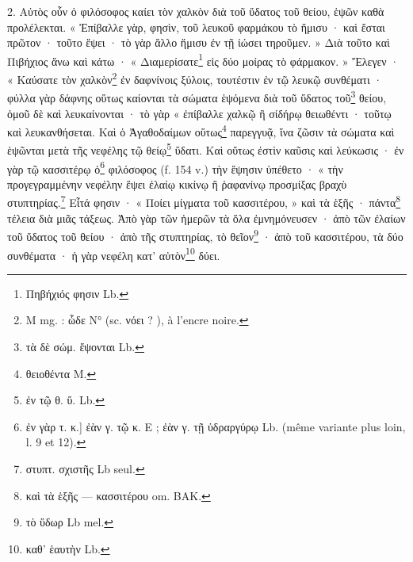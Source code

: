 \documentclass[landscape, a4paper, 11pt, oneside, polutonikogreek, french]{article}
\begin{document}
2. Αὐτὸς οὖν ὁ φιλόσοφος καίει τὸν χαλκὸν διὰ τοῦ ὕδατος τοῦ θείου, ἑψῶν καθὰ προλέλεκται. « Ἐπίβαλλε γὰρ, φησὶν, τοῦ λευκοῦ φαρμάκου τὸ ἥμισυ · καὶ ἔσται πρῶτον · τοῦτο ἕψει · τὸ γὰρ ἄλλο ἥμισυ ἐν τῇ ἰώσει τηροῦμεν. » Διὰ τοῦτο καὶ Πιβήχιος ἄνω καὶ κάτω · « Διαμερίσατε\footnote{Πηβήχιός φησιν Lb.} εἰς δύο μοίρας τὸ φάρμακον. » Ἔλεγεν · « Καύσατε τὸν χαλκὸν\footnote{M mg. : ὧδε N° (sc. νόει ? ), à l'encre noire.} ἐν δαφνίνοις ξύλοις, τουτέστιν ἐν τῷ λευκῷ συνθέματι · φύλλα γὰρ δάφνης οὕτως καίονται τὰ σώματα ἑψόμενα διὰ τοῦ ὕδατος τοῦ\footnote{τὰ δὲ σώμ. ἕψονται Lb.} θείου, ὀμοῦ δὲ καὶ λευκαίνονται · τὸ γὰρ « ἐπίβαλλε χαλκῷ ἢ σίδήρῳ θειωθέντι · τοῦτῳ καὶ λευκανθήσεται. Καὶ ὁ Ἀγαθοδαίμων οὕτως\footnote{θειοθέντα M.} παρεγγυᾷ, ἵνα ζῶσιν τὰ σώματα καὶ ἑψῶνται μετὰ τῆς νεφέλης τῷ θείῳ\footnote{ἐν τῷ θ. ὕ. Lb.} ὕδατι. Καὶ οὕτως ἐστὶν καῦσις καὶ λεύκωσις · ἐν γὰρ τῷ κασσιτέρῳ ὁ\footnote{ἐν γὰρ τ. κ.] ἐὰν γ. τῷ κ. E ; ἐὰν γ. τῇ ὑδραργύρῳ Lb. (même variante plus loin, l. 9 et 12).} φιλόσοφος (f. 154 v.) τὴν ἕψησιν ὑπέθετο · « τὴν προγεγραμμένην νεφέλην ἕψει ἐλαίῳ κικίνῳ ἢ ῥαφανίνῳ προσμίξας βραχὺ στυπτηρίας.\footnote{στυπτ. σχιστῆς Lb seul.} Εἶτά φησιν · « Ποίει μίγματα τοῦ κασσιτέρου, » καὶ τὰ ἑξῆς · πάντα\footnote{καὶ τὰ ἑξῆς --- κασσιτέρου om. BAK.} τέλεια διὰ μιᾶς τάξεως. Ἀπὸ γὰρ τῶν ἡμερῶν τὰ ὅλα ἐμνημόνευσεν · ἀπὸ τῶν ἐλαίων τοῦ ὕδατος τοῦ θείου · ἀπὸ τῆς στυπτηρίας, τὸ θεῖον\footnote{τὸ ὕδωρ Lb mel.} · ἀπὸ τοῦ κασσιτέρου, τὰ δύο συνθέματα · ἡ γὰρ νεφέλη κατ' αὐτὸν\footnote{καθ' ἑαυτὴν Lb.} δύει.
\end{document}
